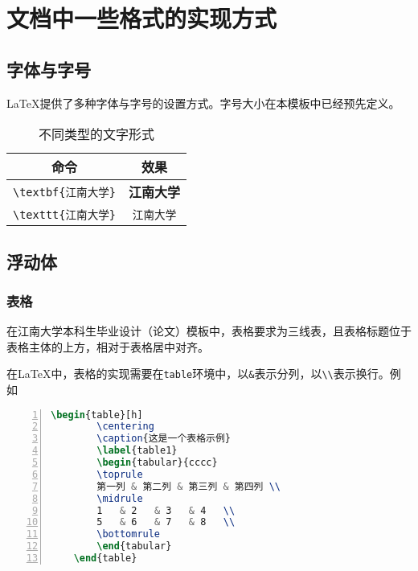 

\chapter{文档中一些格式的实现方式}
\label{ch02}

\section{字体与字号}

\LaTeX{}提供了多种字体与字号的设置方式。字号大小在本模板中已经预先定义。

\begin{table}[h]
    \centering
    \caption{不同类型的文字形式}
    \label{table1}
    \begin{tabular}{cc}
    \toprule
    命令 & 效果  \\
    \midrule
    \texttt{\textbackslash textbf\{江南大学\}}  & \textbf{江南大学} \\
    \texttt{\textbackslash texttt\{江南大学\}}  & \texttt{江南大学} \\
    \bottomrule
    \end{tabular}
\end{table}


\section{浮动体}

\subsection{表格}

在江南大学本科生毕业设计（论文）模板中，表格要求为三线表，且表格标题位于表格主体的上方，相对于表格居中对齐。

在\LaTeX{}中，表格的实现需要在\texttt{table}环境中，以\texttt{\&}表示分列，以\texttt{\textbackslash\textbackslash}表示换行。例如

\begin{lstlisting}[language=tex, breaklines=true, basicstyle=\ttfamily, numbers=left, numberstyle=\tiny, frame=shadowbox]
    \begin{table}[h]
        \centering
        \caption{这是一个表格示例}
        \label{table1}
        \begin{tabular}{cccc}
        \toprule
        第一列 & 第二列 & 第三列 & 第四列 \\
        \midrule
        1   & 2   & 3   & 4   \\
        5   & 6   & 7   & 8   \\
        \bottomrule
        \end{tabular}
    \end{table}
\end{lstlisting}

